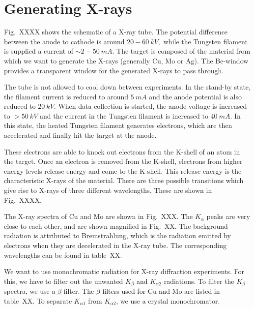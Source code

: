 \section{Generating X-rays}

	Fig.~XXXX shows the schematic of a X-ray tube. The potential difference between the anode to cathode is around $20-60~\si{kV},$ while the Tungsten filament is supplied a current of $\sim 2-50~\si{mA}.$ The target is composed of the material from which we want to generate the X-rays (generally Cu, Mo or Ag). The Be-window provides a transparent window for the generated X-rays to pass through.
	
	The tube is not allowed to cool down between experiments. In the stand-by state, the filament current is reduced to around $\SI{5}{mA}$ and the anode potential is also reduced to $\SI{20}{kV}.$ When data collection is started, the anode voltage is increased to $>\SI{50}{kV}$ and the current in the Tungsten filament is increased to $\SI{40}{mA}.$ In this state, the heated Tungsten filament generates electrons, which are then accelerated and finally hit the target at the anode.
	
	These electrons are able to knock out electrons from the K-shell of an atom in the target. Once an electron is removed from the K-shell, electrons from higher energy levels release energy and come to the K-shell. This release energy is the characteristic X-rays of the material. There are three possible transitions which give rise to X-rays of three different wavelengths. These are shown in Fig.~XXXX.
	
	The X-ray spectra of Cu and Mo are shown in Fig.~XXX. The $K_\alpha$ peaks are very close to each other, and are shown magnified in Fig.~XX. The background radiation is attributed to Bremstrahlung, which is the radiation emitted by electrons when they are decelerated in the X-ray tube. The corresponding wavelengths can be found in table~XX.
	
	We want to use monochromatic radiation for X-ray diffraction experiments. For this, we have to filter out the unwanted $K_\beta$ and $K_{\alpha2}$ radiations. To filter the $K_\beta$ spectra, we use a $\beta$-filter. The  $\beta$-filters used for Cu and Mo are listed in table~XX. To separate $K_{\alpha1}$ from $K_{\alpha2}$, we use a crystal monochromator.